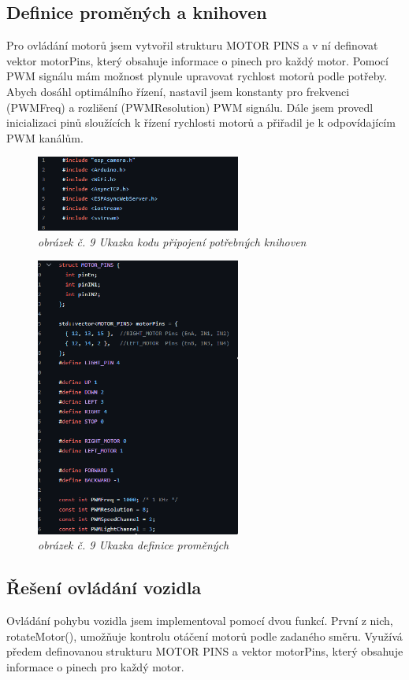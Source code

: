 \documentclass[12pt, a4paper,
oneside,      %
openany
]{report}
\begin{document}
\subsection{Definice proměných a knihoven}
\noindent Pro ovládání motorů jsem vytvořil strukturu MOTOR PINS a v ní definovat vektor motorPins, který obsahuje informace o pinech pro každý motor. Pomocí PWM signálu mám možnost plynule upravovat rychlost motorů podle potřeby. Abych dosáhl optimálního řízení, nastavil jsem konstanty pro frekvenci (PWMFreq) a rozlišení (PWMResolution) PWM signálu. Dále jsem provedl inicializaci pinů sloužících k řízení rychlosti motorů a přiřadil je k odpovídajícím PWM kanálům.
\begin{figure}[H]
		\includegraphics[width=0.6\textwidth]{image/kod1.png}
        \caption*{\textit{obrázek č. 9 Ukazka kodu připojení potřebných knihoven}}
        \label{fig:kod1}
    \end{figure}
\begin{figure}[H]
	\includegraphics[width=0.6\textwidth]{image/kod2.png}
    \caption*{\textit{obrázek č. 9 Ukazka definice proměných}}
    \label{fig:kod2}
\end{figure}

\subsection{Řešení ovládání vozidla}
\noindent Ovládání pohybu vozidla jsem implementoval pomocí dvou funkcí. První z nich, rotateMotor(), umožňuje kontrolu otáčení motorů podle zadaného směru. Využívá předem definovanou strukturu MOTOR PINS a vektor motorPins, který obsahuje informace o pinech pro každý motor.
\end{document}
